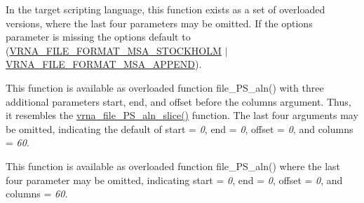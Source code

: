 \begin{DoxyRefList}
\item[Global \mbox{\hyperlink{group__file__formats__msa_gaccca55b71d34def88e18ed9a51ccb2bf}{vrna\+\_\+file\+\_\+msa\+\_\+write}} (const char $\ast$filename, const char $\ast$$\ast$names, const char $\ast$$\ast$aln, const char $\ast$id, const char $\ast$structure, const char $\ast$source, unsigned int options)]\label{wrappers__wrappers000080}%
%
 In the target scripting language, this function exists as a set of overloaded versions, where the last four parameters may be omitted. If the {\ttfamily options} parameter is missing the options default to (\mbox{\hyperlink{group__file__formats__msa_ga62be992445cd8ab2ad7a8fded944338b}{V\+R\+N\+A\+\_\+\+F\+I\+L\+E\+\_\+\+F\+O\+R\+M\+A\+T\+\_\+\+M\+S\+A\+\_\+\+S\+T\+O\+C\+K\+H\+O\+LM}} $\vert$ \mbox{\hyperlink{group__file__formats__msa_ga1577ea0f497d9c501549c863a4f2c089}{V\+R\+N\+A\+\_\+\+F\+I\+L\+E\+\_\+\+F\+O\+R\+M\+A\+T\+\_\+\+M\+S\+A\+\_\+\+A\+P\+P\+E\+ND}}).  
\item[Global \mbox{\hyperlink{group__alignment__plots_ga3bb7409f5b73c2273f9f76cf8b754034}{vrna\+\_\+file\+\_\+\+P\+S\+\_\+aln}} (const char $\ast$filename, const char $\ast$$\ast$seqs, const char $\ast$$\ast$names, const char $\ast$structure, unsigned int columns)]\label{wrappers__wrappers000125}%
%
 This function is available as overloaded function {\ttfamily file\+\_\+\+P\+S\+\_\+aln()} with three additional parameters {\ttfamily start}, {\ttfamily end}, and {\ttfamily offset} before the {\ttfamily columns} argument. Thus, it resembles the {\ttfamily \mbox{\hyperlink{group__alignment__plots_ga2b132dddeb2044e52dc39cf0ad8afaee}{vrna\+\_\+file\+\_\+\+P\+S\+\_\+aln\+\_\+slice()}}} function. The last four arguments may be omitted, indicating the default of {\ttfamily start} = {\itshape 0}, {\ttfamily end} = {\itshape 0}, {\ttfamily offset} = {\itshape 0}, and {\ttfamily columns} = {\itshape 60}.  
\item[Global \mbox{\hyperlink{group__alignment__plots_ga2b132dddeb2044e52dc39cf0ad8afaee}{vrna\+\_\+file\+\_\+\+P\+S\+\_\+aln\+\_\+slice}} (const char $\ast$filename, const char $\ast$$\ast$seqs, const char $\ast$$\ast$names, const char $\ast$structure, unsigned int start, unsigned int end, int offset, unsigned int columns)]\label{wrappers__wrappers000126}%
%
 This function is available as overloaded function {\ttfamily file\+\_\+\+P\+S\+\_\+aln()} where the last four parameter may be omitted, indicating {\ttfamily start} = {\itshape 0}, {\ttfamily end} = {\itshape 0}, {\ttfamily offset} = {\itshape 0}, and {\ttfamily columns} = {\itshape 60}. 

\end{DoxyRefList}
